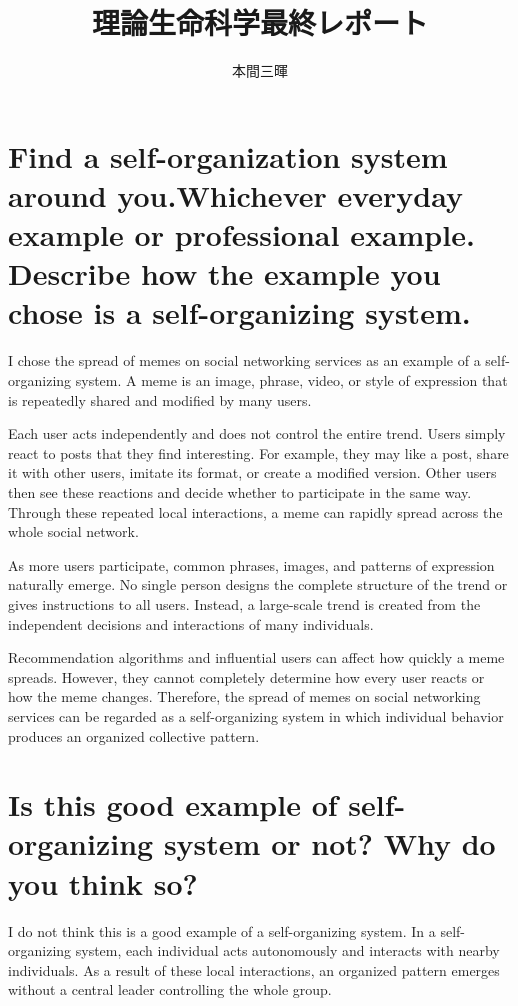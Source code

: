 \documentclass[titlepage,a4paper]{jsarticle}
\title{理論生命科学最終レポート}
\author{本間三暉}
\begin{document}
\maketitle
\section{Find a self-organization system around you.Whichever everyday example or professional example.
Describe how the example you chose is a self-organizing system.}
I chose the spread of memes on social networking services as an example of a self-organizing system.
A meme is an image, phrase, video, or style of expression that is repeatedly shared and modified by many users.

Each user acts independently and does not control the entire trend. 
Users simply react to posts that they find interesting. 
For example, they may like a post, share it with other users, imitate its format, or create a modified version. 
Other users then see these reactions and decide whether to participate in the same way.
Through these repeated local interactions, a meme can rapidly spread across the whole social network.

As more users participate, common phrases, images, and patterns of expression naturally emerge.
 No single person designs the complete structure of the trend or gives instructions to all users. Instead, a large-scale trend is created from the independent decisions and interactions of many individuals.

Recommendation algorithms and influential users can affect how quickly a meme spreads. However, they cannot completely determine how every user reacts or how the meme changes. Therefore, the spread of memes on social networking services can be regarded as a self-organizing system in which individual behavior produces an organized collective pattern.


\section{Is this good example of self-organizing system or not? Why do you think so?}
I do not think this is a good example of a self-organizing system. In a self-organizing system, each individual acts autonomously and interacts with nearby individuals. As a result of these local interactions, an organized pattern emerges without a central leader controlling the whole group.
\end{document}
